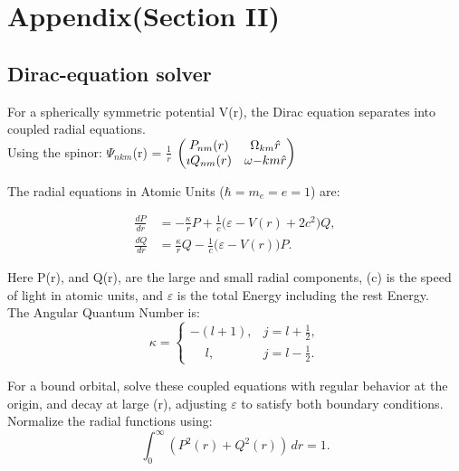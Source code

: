 \documentclass[a4paper, 10pt, onepage]{elegantbook}
\begin{document}
\newpage

\chapter{Appendix(Section II)}

\section{Dirac-equation solver}

For a spherically symmetric potential V(r), the Dirac equation separates into coupled radial equations.  \\

Using the spinor:
$\Psi_{nkm}$(r) = $\frac{1}{r}$  $\begin{pmatrix}P_{nm}(r) & \Omega_{km}  \hat{r} \cr \imath Q_{nm}(r) & \omega{-km}  \hat{r} \end{pmatrix}$

\noindent

The radial equations in Atomic Units ($\hbar = m_e = e = 1$) are:

\begin{align}
\frac{dP}{dr}
&= -\frac{\kappa}{r}P
   + \frac{1}{c}\bigl(\varepsilon - V(r) + 2c^2\bigr)Q,\\
\frac{dQ}{dr}
&= \frac{\kappa}{r}Q
   - \frac{1}{c}\bigl(\varepsilon - V(r)\bigr)P.
\end{align}

Here P(r), and Q(r), are the large and small radial components, (c) is the speed of light in atomic units, and $\varepsilon$ is the total Energy including the rest Energy.  \\

The Angular Quantum Number is:  \\

\[
\kappa =
\begin{cases}
-(l+1), & j=l+\tfrac12,\\
\phantom{-}l, & j=l-\tfrac12.
\end{cases}
\]

For a bound orbital, solve these coupled equations with regular behavior at the origin, and decay at large (r), adjusting $\varepsilon$ to satisfy both boundary conditions.  \\

Normalize the radial functions using:  \\

\[
\int_0^\infty \left(P^2(r)+Q^2(r)\right)\,dr=1.
\]
\end{document}
